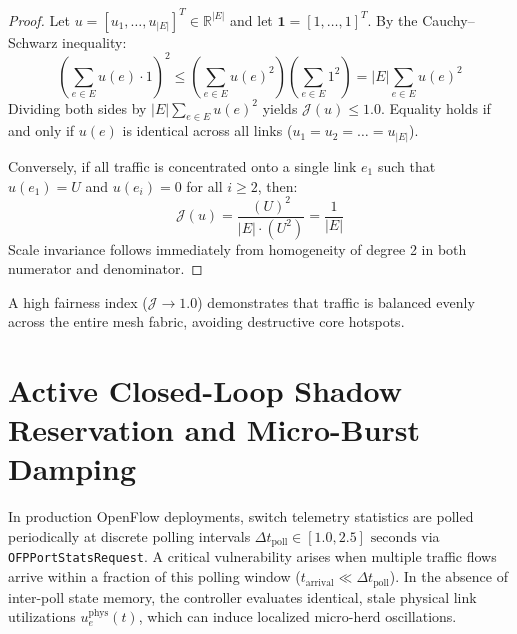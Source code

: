 \documentclass[12pt,a4paper,oneside]{report}
\begin{document}
\begin{proof}
Let $u = [u_1, \dots, u_{|E|}]^T \in \mathbb{R}^{|E|}$ and let $\mathbf{1} = [1, \dots, 1]^T$. By the Cauchy--Schwarz inequality:
\begin{equation}
    \left( \sum_{e \in E} u(e) \cdot 1 \right)^2 \le \left( \sum_{e \in E} u(e)^2 \right) \left( \sum_{e \in E} 1^2 \right) = |E| \sum_{e \in E} u(e)^2
\end{equation}
Dividing both sides by $|E| \sum_{e \in E} u(e)^2$ yields $\mathcal{J}(u) \le 1.0$. Equality holds if and only if $u(e)$ is identical across all links ($u_1 = u_2 = \dots = u_{|E|}$).

Conversely, if all traffic is concentrated onto a single link $e_1$ such that $u(e_1) = U$ and $u(e_i) = 0$ for all $i \ge 2$, then:
\begin{equation}
    \mathcal{J}(u) = \frac{(U)^2}{|E| \cdot (U^2)} = \frac{1}{|E|}
\end{equation}
Scale invariance follows immediately from homogeneity of degree 2 in both numerator and denominator.
\end{proof}

A high fairness index ($\mathcal{J} \to 1.0$) demonstrates that traffic is balanced evenly across the entire mesh fabric, avoiding destructive core hotspots.

\section{Active Closed-Loop Shadow Reservation and Micro-Burst Damping}
\label{sec:shadow_reservation_math}
In production OpenFlow deployments, switch telemetry statistics are polled periodically at discrete polling intervals $\Delta t_{\text{poll}} \in [1.0, 2.5]\text{ seconds}$ via \texttt{OFPPortStatsRequest}. A critical vulnerability arises when multiple traffic flows arrive within a fraction of this polling window ($t_{\text{arrival}} \ll \Delta t_{\text{poll}}$). In the absence of inter-poll state memory, the controller evaluates identical, stale physical link utilizations $u_e^{\text{phys}}(t)$, which can induce localized micro-herd oscillations.
\end{document}
